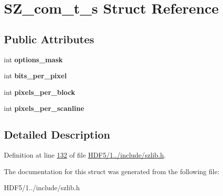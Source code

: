 \hypertarget{struct_s_z__com__t__s}{}\section{S\+Z\+\_\+com\+\_\+t\+\_\+s Struct Reference}
\label{struct_s_z__com__t__s}
\subsection*{Public Attributes}
\begin{DoxyCompactItemize}
\item 
\mbox{\label{struct_s_z__com__t__s_a8168e1d8b7da7b7f8ad814f333f0625a}} 
int {\bfseries options\+\_\+mask}
\item 
\mbox{\label{struct_s_z__com__t__s_a5179d77eaf509cb7b734858c1329c9cf}} 
int {\bfseries bits\+\_\+per\+\_\+pixel}
\item 
\mbox{\label{struct_s_z__com__t__s_a0600c7c1e4b5071c0245132797a90d93}} 
int {\bfseries pixels\+\_\+per\+\_\+block}
\item 
\mbox{\label{struct_s_z__com__t__s_ab5a8912b25c3e1f476022014206458ce}} 
int {\bfseries pixels\+\_\+per\+\_\+scanline}
\end{DoxyCompactItemize}


\subsection{Detailed Description}


Definition at line \hyperlink{_h_d_f5_21_810_81_2include_2szlib_8h_source_l00132}{132} of file \hyperlink{_h_d_f5_21_810_81_2include_2szlib_8h_source}{H\+D\+F5/1../include/szlib.\+h}.



The documentation for this struct was generated from the following file\+:\begin{DoxyCompactItemize}
\item 
H\+D\+F5/1../include/szlib.\+h\end{DoxyCompactItemize}
